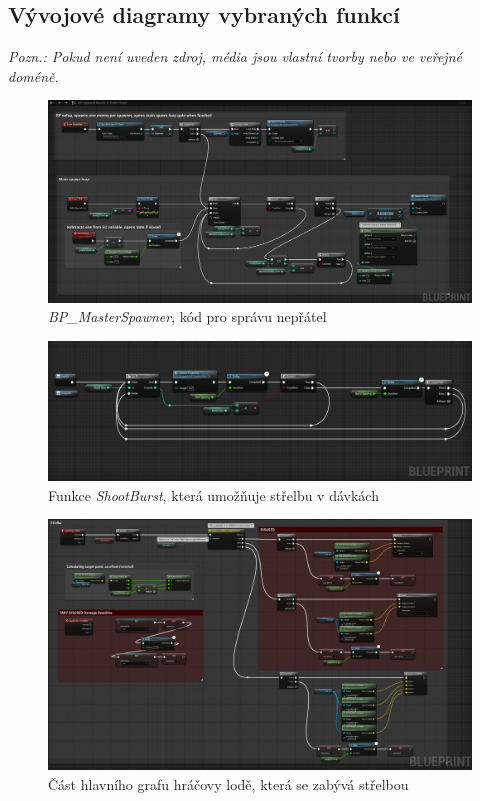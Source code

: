 \documentclass[12pt,a4paper,hidelinks]{article}
\begin{document}
\clearpage
\begin{landscape}
\appendix
\section{Vývojové diagramy vybraných funkcí}
\textit{Pozn.: Pokud není uveden zdroj, média jsou vlastní tvorby nebo ve veřejné doméně.}

\begin{figure}[h!]
\centering
\includegraphics[width=1.0\linewidth]{images/masterspawner_nodesc.png}
\caption{\textit{BP{\_}MasterSpawner}, kód pro správu nepřátel}
\label{masterspawner}
\end{figure}
\clearpage

\begin{figure}[h!]
\centering
\includegraphics[width=1.0\linewidth]{images/shoot_burst.png}
\caption{Funkce \textit{ShootBurst}, která umožňuje střelbu v dávkách}
\label{burst}
\end{figure}
\clearpage

\begin{figure}[h!]
\centering
\includegraphics[width=1.0\linewidth]{images/player_eventgraph.png}
\caption{Část hlavního grafu hráčovy lodě, která se zabývá střelbou}
\end{figure}
\clearpage


\end{landscape}
\end{document}
